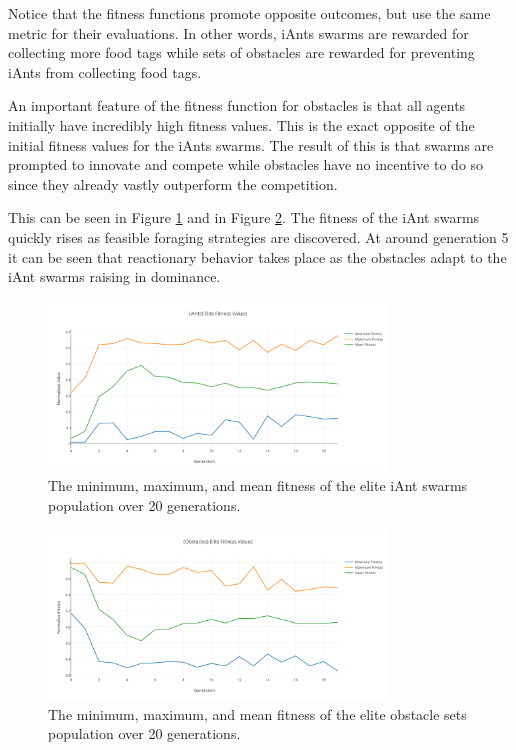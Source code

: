 \documentclass{acm_proc_article-sp}
\begin{document}
Notice that the fitness functions promote opposite outcomes, but use the same metric for their evaluations. In other words, iAnts swarms are rewarded for collecting more food tags while sets of obstacles are rewarded for preventing iAnts from collecting food tags.

An important feature of the fitness function for obstacles is that all agents initially have incredibly high fitness values. This is the exact opposite of the initial fitness values for the iAnts swarms. The result of this is that swarms are prompted to innovate and compete while obstacles have no incentive to do so since they already vastly outperform the competition.

This can be seen in Figure \ref{fig:iAntfitness20} and in Figure \ref{fig:obstaclefitness20}. The fitness of the iAnt swarms quickly rises as feasible foraging strategies are discovered. At around generation 5 it can be seen that reactionary behavior takes place as the obstacles adapt to the iAnt swarms raising in dominance.

\begin{figure}[h]
	\includegraphics[width=9cm]{images/iAntsEliteFitnessValues20}
	\caption{The minimum, maximum, and mean fitness of the elite iAnt swarms population over 20 generations.} 
	\label{fig:iAntfitness20}
\end{figure}

\begin{figure}[h]
	\includegraphics[width=9cm]{images/ObstaclesEliteFitnessValues20}
	\caption{The minimum, maximum, and mean fitness of the elite obstacle sets population over 20 generations.} 
	\label{fig:obstaclefitness20}
\end{figure}
\end{document}
